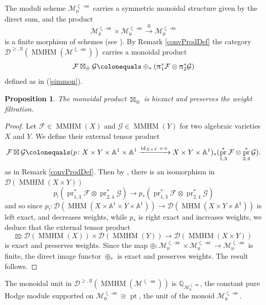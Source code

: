 \documentclass[a4paper,10pt]{amsart}
\renewcommand{\zeta}{\upzeta}
\renewcommand{\pi}{\uppi\hspace{0.05em}}
\renewcommand{\mu}{\upmu}
\newtheorem{proposition}[theorem]{Proposition}
\newcommand{\Msp}{\mathcal{M}}
\DeclareMathOperator{\sst}{-ss}
\DeclareMathOperator{\MMHM}{MMHM}
\DeclareMathOperator{\MHM}{MHM}
\DeclareMathOperator{\id}{id}
\DeclareMathOperator{\pt}{pt}
\DeclareMathOperator{\pr}{pr}
\newcommand{\Dulf}{\mathcal{D}^{\geq, \mathrm{lf}}}
\newcommand{\Dub}{\mathcal{D}}
\begin{document}
The moduli scheme $\Msp_{\mu}^{\zeta\sst}$ carries a symmetric monoidal structure given by the direct sum, and the product 
\[
\Msp_{\mu}^{\zeta\sst}\times \Msp_{\mu}^{\zeta\sst}\xrightarrow{\oplus}\Msp_{\mu}^{\zeta\sst}
\]
is a finite morphism of schemes (see \cite[Lem.2.1]{Meinhardt14}).  By Remark \ref{convProdDef} the category $\Dulf(\MMHM(\mathcal{M}^{\zeta\sst}))$ carries a monoidal product
\[
\mathcal{F}\boxtimes_{\oplus}\mathcal{G}\colonequals \oplus_*(\pi_1^*\mathcal{F}\otimes\pi_2^*\mathcal{G})  
\]
defined as in (\ref{simmon}).
\begin{proposition}
\label{biExp}
The monoidal product $\boxtimes_{\oplus}$ is biexact and preserves the weight filtration.  
\end{proposition}
\begin{proof}
Let $\mathcal{F}\in\MMHM(X)$ and $\mathcal{G}\in\MMHM(Y)$ for two algebraic varieties $X$ and $Y$.  We define their external tensor product 
\[
\mathcal{F}\boxtimes \mathcal{G}\colonequals (p\colon X\times Y\times\mathbb{A}^1\times\mathbb{A}^1\xrightarrow{\id_{X\times Y}\times +} X\times Y\times \mathbb{A}^1)_*(\pr_{1,3}^*\mathcal{F}\otimes\pr_{2,4}^*\mathcal{G}).
\]
as in Remark \ref{convProdDef}.  Then by \cite[Lem.1]{KS2}, there is an isomorphism in $\Dub(\MMHM(X\times Y))$
\[
p_!\left(\pr_{1,3}^*\mathcal{F}\otimes\pr_{2,4}^*\mathcal{G}\right)\rightarrow p_*\left(\pr_{1,3}^*\mathcal{F}\otimes\pr_{2,4}^*\mathcal{G}\right)
\]
and so since $p_!\colon \Dub(\MHM(X\times \mathbb{A}^1\times Y\times\mathbb{A}^1))\rightarrow \Dub(\MHM(X\times Y\times \mathbb{A}^1))$ is left exact, and decreases weights, while $p_*$ is right exact and increases weights, we deduce that the external tensor product 
\[
\boxtimes\colon \Dub(\MMHM(X))\times\Dub(\MMHM(Y))\rightarrow \Dub(\MMHM(X\times Y))
\]
is exact and preserves weights.  
\smallbreak
Since the map $\oplus\colon \Msp_{\mu}^{\zeta\sst}\times \Msp_{\mu}^{\zeta\sst}\rightarrow \Msp_{\mu}^{\zeta\sst}$ is finite, the direct image functor $\oplus_*$ is exact and preserves weights.  The result follows.
\end{proof}
The monoidal unit in $\Dulf(\MMHM(\mathcal{M}^{\zeta\sst}))$ is $\mathbb{Q}_{{\Msp_0^{\zeta\sst}}}$, the constant pure Hodge module supported on $\Msp_0^{\zeta\sst}\cong \pt$, the unit of the monoid $\Msp_{\mu}^{\zeta\sst}$.  

\smallbreak
\end{document}
